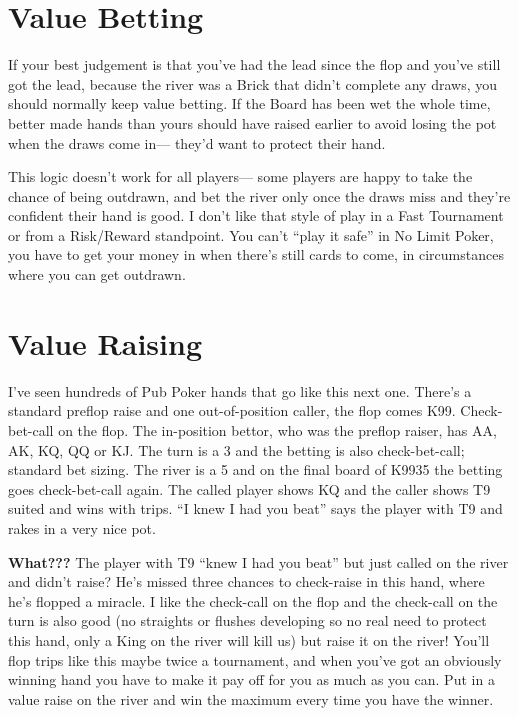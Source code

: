 \section{Value Betting}

If your best judgement is that you've had the lead since the flop
and you've still got the lead, because the river was a Brick
that didn't complete any draws, you should normally keep value betting.
If the Board has been wet the whole time, better made hands than
yours should have raised earlier to avoid losing the pot when the
draws come in--- they'd want to protect their hand.

This logic doesn't work for all players--- some players are happy
to take the chance of being outdrawn, and bet the river only once
the draws miss and they're confident their hand is good. I don't
like that style of play in a Fast Tournament or from a
Risk/Reward standpoint. You can't ``play it safe'' in No Limit Poker,
you have to get your money in when there's still cards to come, in
circumstances where you can get outdrawn.

\section{Value Raising}

I've seen hundreds of Pub Poker hands that go like this next
one. There's a standard preflop raise and one out-of-position caller,
the flop comes K99. Check-bet-call on the flop. The in-position
bettor, who was the preflop raiser, has AA, AK, KQ, QQ or KJ. The turn
is a 3 and the betting is also check-bet-call; standard bet
sizing. The river is a 5 and on the final board of K9935 the betting
goes check-bet-call again. The called player shows KQ and the caller
shows T9 suited and wins with trips. ``I knew I had you beat'' says the
player with T9 and rakes in a very nice pot.

\textbf{What???} The player with T9 ``knew I had you beat'' but just
called on the river and didn't raise? He's missed three chances to
check-raise in this hand, where he's flopped a miracle. I like the
check-call on the flop and the check-call on the turn is also good (no
straights or flushes developing so no real need to protect this hand,
only a King on the river will kill us) but raise it on the river!
You'll flop trips like this maybe twice a tournament, and when you've
got an obviously winning hand you have to make it pay off for you as
much as you can. Put in a value raise on the river and win the maximum
every time you have the winner.

